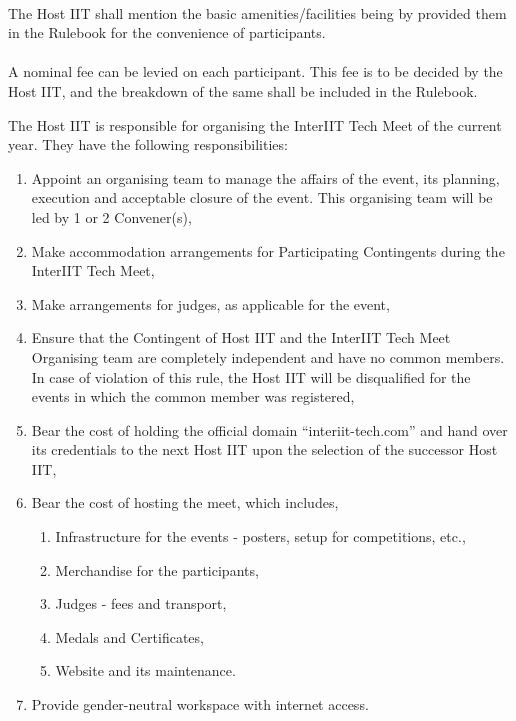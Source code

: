 \paragraph{}
The Host IIT shall mention the basic amenities/facilities being by provided them in the Rulebook for the convenience of participants.

\paragraph{}
A nominal fee can be levied on each participant. This fee is to be decided by the Host IIT, and the breakdown of the same shall be included in the Rulebook.


The Host IIT is responsible for organising the InterIIT Tech Meet of the current year. They have the following responsibilities:
\begin{enumerate}
    \item Appoint an organising team to manage the affairs of the event, its planning, execution and acceptable closure of the event. This organising team will be led by 1 or 2 Convener(s),
    \item Make accommodation arrangements for Participating Contingents during the InterIIT Tech Meet,
    \item Make arrangements for judges, as applicable for the event,
    \item Ensure that the Contingent of Host IIT and the InterIIT Tech Meet Organising team are completely independent and have no common members. In case of violation of this rule, the Host IIT will be disqualified for the events in which the common member was registered,
    \item Bear the cost of holding the official domain “interiit-tech.com” and hand over its credentials to the next Host IIT upon the selection of the successor Host IIT,
    \item Bear the cost of hosting the meet, which includes,
    \begin{enumerate}
        \item Infrastructure for the events - posters, setup for competitions, etc.,
        \item Merchandise for the participants,
        \item Judges - fees and transport,
        \item Medals and Certificates,
        \item Website and its maintenance.
    \end{enumerate}
    \item Provide gender-neutral workspace with internet access.
\end{enumerate}

